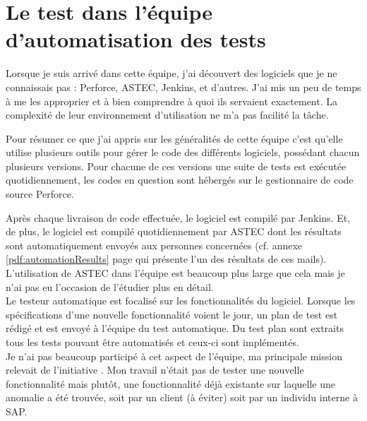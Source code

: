 \section{Le test dans l'\'{e}quipe d'automatisation des tests}
Lorsque je suis arriv\'{e} dans cette \'{e}quipe, j'ai d\'{e}couvert des logiciels que je ne connaissais pas : Perforce, ASTEC, Jenkins, et d'autres. J'ai mis un peu de temps \`{a} me les approprier et \`{a} bien comprendre \`{a} quoi ils servaient exactement. La complexit\'{e} de leur environnement d'utilisation ne m'a pas facilit\'{e} la t\^{a}che. 

Pour r\'{e}sumer ce que j'ai appris sur les g\'{e}n\'{e}ralit\'{e}s de cette \'{e}quipe c'est qu'elle utilise plusieurs outils pour g\'{e}rer le code des diff\'{e}rents logiciels, poss\'{e}dant chacun plusieurs versions. Pour chacune de ces versions une suite de tests est ex\'{e}cut\'{e}e quotidiennement, les codes en question sont h\'{e}berg\'{e}s sur le gestionnaire de code source Perforce. 

Apr\`{e}s chaque livraison de code effectu\'{e}e, le logiciel est compil\'{e} par Jenkins. Et, de plus, le logiciel est compil\'{e} quotidiennement par ASTEC dont les r\'{e}sultats sont automatiquement envoy\'{e}s aux personnes concern\'{e}es (cf. annexe \ref{pdf:automationResults} page \pageref{pdf:automationResults} qui pr\'{e}sente l'un des r\'{e}sultats de ces mails). L'utilisation de ASTEC dans l'\'{e}quipe est beaucoup plus large que cela mais je n'ai pas eu l'occasion de l'\'{e}tudier plus en d\'{e}tail.\\



Le testeur automatique est focalis\'{e} sur les fonctionnalit\'{e}s du logiciel. Lorsque les sp\'{e}cifications d'une nouvelle fonctionnalit\'{e} voient le jour, un plan de test est r\'{e}dig\'{e} et est envoy\'{e} \`{a} l'\'{e}quipe du test automatique. Du test plan sont extraits tous les tests pouvant \^{e}tre automatis\'{e}s et ceux-ci sont impl\'{e}ment\'{e}s.\\
Je n'ai pas beaucoup particip\'{e} \`{a} cet aspect de l'\'{e}quipe, ma principale mission relevait de l'initiative . Mon travail n'\'{e}tait pas de tester une nouvelle fonctionnalit\'{e} mais plut\^{o}t, une fonctionnalit\'{e} d\'{e}j\`{a} existante sur laquelle une anomalie a \'{e}t\'{e} trouv\'{e}e, soit par un client (\`{a} \'{e}viter) soit par un individu interne \`{a} SAP.\\

